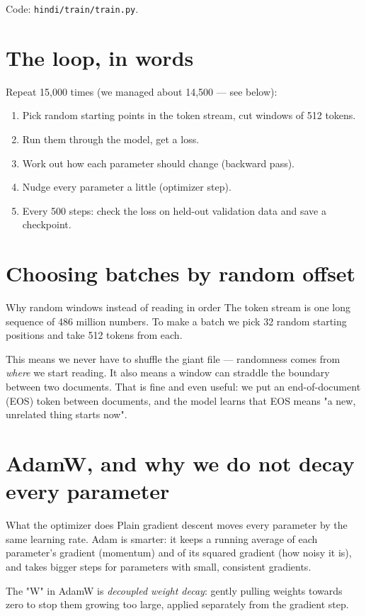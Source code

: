 \documentclass[11pt]{report}
\newcommand{\p}[1]{\texttt{#1}}
\begin{document}
Code: \p{hindi/train/train.py}.

\section{The loop, in words}

Repeat 15,000 times (we managed about 14,500 --- see below):

\begin{enumerate}[leftmargin=*]
\item Pick random starting points in the token stream, cut windows of 512 tokens.
\item Run them through the model, get a loss.
\item Work out how each parameter should change (backward pass).
\item Nudge every parameter a little (optimizer step).
\item Every 500 steps: check the loss on held-out validation data and save a
      checkpoint.
\end{enumerate}

\section{Choosing batches by random offset}

\begin{concept}{Why random windows instead of reading in order}
The token stream is one long sequence of 486 million numbers. To make a batch we
pick 32 random starting positions and take 512 tokens from each.

This means we never have to shuffle the giant file --- randomness comes from
\emph{where} we start reading. It also means a window can straddle the boundary
between two documents. That is fine and even useful: we put an end-of-document
(EOS) token between documents, and the model learns that EOS means "a new,
unrelated thing starts now".
\end{concept}

\section{AdamW, and why we do not decay every parameter}

\begin{concept}{What the optimizer does}
Plain gradient descent moves every parameter by the same learning rate. Adam is
smarter: it keeps a running average of each parameter's gradient (momentum) and of
its squared gradient (how noisy it is), and takes bigger steps for parameters with
small, consistent gradients.

The "W" in AdamW is \emph{decoupled weight decay}: gently pulling weights towards
zero to stop them growing too large, applied separately from the gradient step.
\end{concept}
\end{document}
